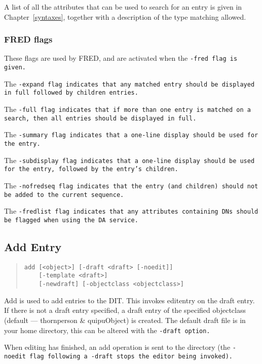 A list of all the attributes that can be used to search for an entry
is given in 
Chapter~\ref{syntaxes}, together with a description of the type
matching allowed.

\subsubsection{FRED flags}\label{fred:flags}
These flags are used by FRED,
and are activated when the \tt -fred\rm \ flag is given.

The \tt -expand\rm \ flag indicates that any matched entry should be
displayed in full followed by children entries.

The \tt -full\rm \ flag indicates that if more than one entry is matched on a
search,
then all entries should be displayed in full.

The \tt -summary\rm \ flag indicates that a one-line display should be used for
the entry.

The \tt -subdisplay\rm \ flag indicates that a one-line display should be used
for the entry, followed by the entry's children.

The \tt -nofredseq\rm \ flag indicates that the entry (and children) should
not be added to the current sequence.

The \tt -fredlist\rm \ flag indicates that any attributes containing
DNs should be flagged when using the DA service.

\subsection {Add Entry}
\label{dish:add}

\begin{quote}\begin{verbatim}
add [<object>] [-draft <draft> [-noedit]] 
    [-template <draft>] 
    [-newdraft] [-objectclass <objectclass>]
\end{verbatim}\end{quote}

Add is used to add entries to the DIT.
This invokes editentry
on the draft entry.
If there is not a draft entry specified, a draft entry of the specified 
objectclass (default --- thornperson \& quipuObject) is created.
The default draft file is  in your home directory, this can be
altered with the \tt -draft\rm \ option.

When editing has finished, an add operation is sent to the directory
(the \tt -noedit\rm \ flag following a \tt -draft\rm \ stops the editor
being invoked).

